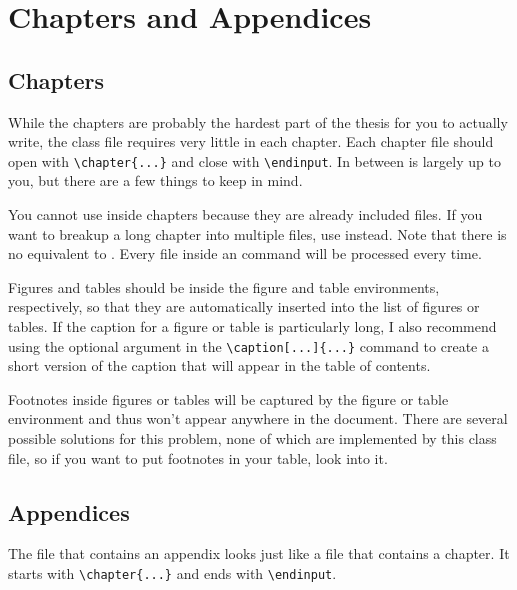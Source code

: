 \chapter{Chapters and Appendices}

\section{Chapters}
While the chapters are probably the hardest part of the thesis for you to actually write, the class file requires very little in each chapter.  Each chapter file should open with \verb=\chapter{...}= and close with \verb=\endinput=.  In between is largely up to you, but there are a few things to keep in mind.

You cannot use \verb== inside chapters because they are already included files.  If you want to breakup a long chapter into multiple files, use \verb== instead.  Note that there is no \verb== equivalent to \verb==.  Every file inside an \verb== command will be processed every time.

Figures and tables should be inside the figure and table environments, respectively, so that they are automatically inserted into the list of figures or tables.  If the caption for a figure or table is particularly long, I also recommend using the optional argument in the \verb=\caption[...]{...}= command to create a short version of the caption that will appear in the table of contents.

Footnotes inside figures or tables will be captured by the figure or table environment and thus won't appear anywhere in the document.  There are several possible solutions for this problem, none of which are implemented by this class file, so if you want to put footnotes in your table, look into it.

\section{Appendices}
The file that contains an appendix looks just like a file that contains a chapter.  It starts with \verb=\chapter{...}= and ends with \verb=\endinput=.

